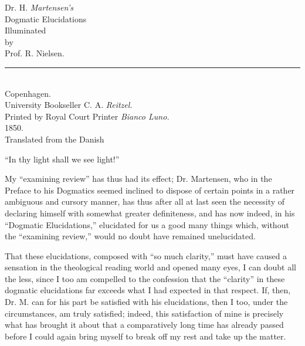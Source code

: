 \documentclass[12pt,a4paper,openany]{book}
\newcommand{\opage}[1]{\marginnote{\footnotesize\textit{[#1]}}}
\begin{document}
\begin{titlepage}
\begin{center}
\vspace*{3em}
{\large Dr. H. \emph{Martensen's}}\\[1em]
{\Huge Dogmatic Elucidations}\\[1.5em]
Illuminated\\[0.8em]
by\\[0.8em]
Prof. R. Nielsen.\\[2em]
\rule{8em}{0.4pt}\\[2em]
{\large Copenhagen.}\\[0.5em]
University Bookseller C. A. \emph{Reitzel.}\\[0.5em]
{\small Printed by Royal Court Printer \emph{Bianco Luno.}}\\[0.5em]
1850.\\[4em]
{\small Translated from the Danish}
\end{center}
\end{titlepage}
\thispagestyle{empty}
\vspace*{12em}
\begin{center}
``In thy light shall we see light!''\\[0.4em]
\hspace*{6em}{\small A Dogmatic Elucidation.}
\end{center}
\clearpage

\setcounter{footnote}{0}%
\opage{3}My ``examining review'' has thus had its effect;
Dr. Martensen, who in the Preface to his Dogmatics seemed
inclined to dispose of certain points in a rather ambiguous
and cursory manner, has thus after all at last seen the necessity
of declaring himself with somewhat greater definiteness,
and has now indeed, in his ``Dogmatic Elucidations,'' elucidated
for us a good many things which, without the ``examining review,'' would no doubt
have remained unelucidated.

That these elucidations, composed with ``so much clarity,''
must have caused a sensation in the theological reading world
and opened many eyes, I can doubt all the less,
since I too am compelled to the confession that the ``clarity''
in these dogmatic elucidations far exceeds what
I had expected in that respect. If, then, Dr. M. can for
his part be satisfied with his elucidations, then
I too, under the circumstances, am truly satisfied; indeed,
this satisfaction of mine is precisely what has brought it about that a comparatively
long time has already passed before I could again
bring myself to break off my rest and take up
the matter.
\end{document}
